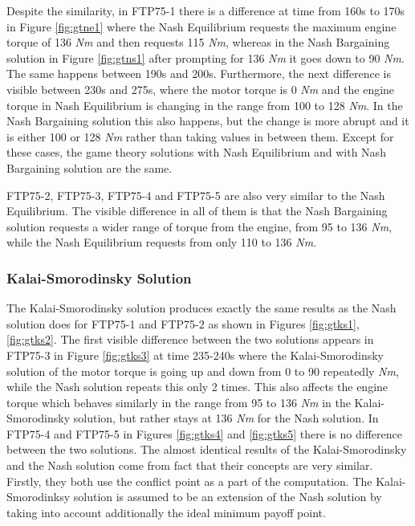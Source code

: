 Despite the similarity, in FTP75-1 there is a difference at time from 160s to 170s in Figure \ref{fig:gtne1} where the Nash Equilibrium requests the maximum engine torque of 136 \textit{Nm} and then requests 115 \textit{Nm}, whereas in the Nash Bargaining solution in Figure \ref{fig:gtns1} after prompting for 136 \textit{Nm} it goes down to 90 \textit{Nm}. The same happens between 190s and 200s. Furthermore, the next difference is visible between 230s and 275s, where the motor torque is 0 \textit{Nm} and the engine torque in Nash Equilibrium is changing in the range from 100 to 128 \textit{Nm}. In the Nash Bargaining solution this also happens, but the change is more abrupt and it is either 100 or 128 \textit{Nm} rather than taking values in between them. Except for these cases, the game theory solutions with Nash Equilibrium and with Nash Bargaining solution are the same.

FTP75-2, FTP75-3, FTP75-4 and FTP75-5 are also very similar to the Nash Equilibrium. The visible difference in all of them is that the Nash Bargaining solution requests a wider range of torque from the engine, from 95 to 136 \textit{Nm}, while the Nash Equilibrium requests from only 110 to 136 \textit{Nm}.

\subsubsection{Kalai-Smorodinsky Solution}
The Kalai-Smorodinsky solution produces exactly the same results as the Nash solution does for FTP75-1 and FTP75-2 as shown in Figures \ref{fig:gtks1}, \ref{fig:gtks2}. The first visible difference between the two solutions appears in FTP75-3 in Figure \ref{fig:gtks3} at time 235-240s where the Kalai-Smorodinsky solution of the motor torque is going up and down from 0 to 90 repeatedly \textit{Nm}, while the Nash solution repeats this only 2 times. This also affects the engine torque which behaves similarly in the range from 95 to 136 \textit{Nm} in the Kalai-Smorodinsky solution, but rather stays at 136 \textit{Nm} for the Nash solution. In FTP75-4 and FTP75-5 in Figures \ref{fig:gtks4} and \ref{fig:gtks5} there is no difference between the two solutions. The almost identical results of the Kalai-Smorodinsky and the Nash solution come from fact that their concepts are very similar. Firstly, they both use the conflict point as a part of the computation. The Kalai-Smorodinksy solution is assumed to be an extension of the Nash solution by taking into account additionally the ideal minimum payoff point.

